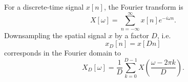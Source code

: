 \documentclass[twocolumn, openany, oneside, article]{memoir}
\begin{document}
For a discrete-time signal $x[n]$, the Fourier transform is
\begin{equation}
  X[\omega] = \sum_{n = -\infty}^{\infty} x[n] e^{-i\omega n}.
\end{equation}
Downsampling the spatial signal $x$ by a factor $D$, i.e.
\begin{equation}
  x_D[n] = x[Dn]
\end{equation}
corresponds in the Fourier domain to
\begin{equation}
  X_D[\omega] = \frac{1}{D}\sum_{k=0}^{D-1}X(\frac{\omega - 2 \pi k}{D}).
\end{equation}





\printbibliography
\end{document}
